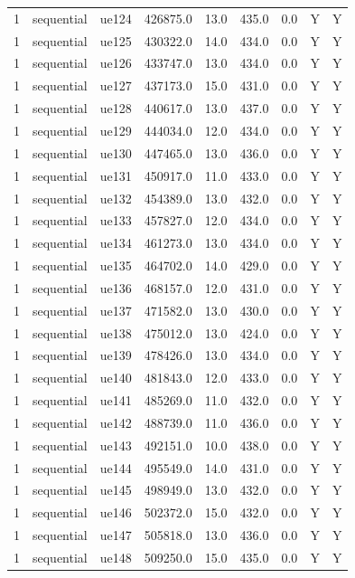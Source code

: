 \begin{table}[ht]
\begin{tabular}{|c|c|c|c|c|c|c|c|c|}
1 & sequential & ue124 & 426875.0 & 13.0 & 435.0 & 0.0 & Y & Y \\
1 & sequential & ue125 & 430322.0 & 14.0 & 434.0 & 0.0 & Y & Y \\
1 & sequential & ue126 & 433747.0 & 13.0 & 434.0 & 0.0 & Y & Y \\
1 & sequential & ue127 & 437173.0 & 15.0 & 431.0 & 0.0 & Y & Y \\
1 & sequential & ue128 & 440617.0 & 13.0 & 437.0 & 0.0 & Y & Y \\
1 & sequential & ue129 & 444034.0 & 12.0 & 434.0 & 0.0 & Y & Y \\
1 & sequential & ue130 & 447465.0 & 13.0 & 436.0 & 0.0 & Y & Y \\
1 & sequential & ue131 & 450917.0 & 11.0 & 433.0 & 0.0 & Y & Y \\
1 & sequential & ue132 & 454389.0 & 13.0 & 432.0 & 0.0 & Y & Y \\
1 & sequential & ue133 & 457827.0 & 12.0 & 434.0 & 0.0 & Y & Y \\
1 & sequential & ue134 & 461273.0 & 13.0 & 434.0 & 0.0 & Y & Y \\
1 & sequential & ue135 & 464702.0 & 14.0 & 429.0 & 0.0 & Y & Y \\
1 & sequential & ue136 & 468157.0 & 12.0 & 431.0 & 0.0 & Y & Y \\
1 & sequential & ue137 & 471582.0 & 13.0 & 430.0 & 0.0 & Y & Y \\
1 & sequential & ue138 & 475012.0 & 13.0 & 424.0 & 0.0 & Y & Y \\
1 & sequential & ue139 & 478426.0 & 13.0 & 434.0 & 0.0 & Y & Y \\
1 & sequential & ue140 & 481843.0 & 12.0 & 433.0 & 0.0 & Y & Y \\
1 & sequential & ue141 & 485269.0 & 11.0 & 432.0 & 0.0 & Y & Y \\
1 & sequential & ue142 & 488739.0 & 11.0 & 436.0 & 0.0 & Y & Y \\
1 & sequential & ue143 & 492151.0 & 10.0 & 438.0 & 0.0 & Y & Y \\
1 & sequential & ue144 & 495549.0 & 14.0 & 431.0 & 0.0 & Y & Y \\
1 & sequential & ue145 & 498949.0 & 13.0 & 432.0 & 0.0 & Y & Y \\
1 & sequential & ue146 & 502372.0 & 15.0 & 432.0 & 0.0 & Y & Y \\
1 & sequential & ue147 & 505818.0 & 13.0 & 436.0 & 0.0 & Y & Y \\
1 & sequential & ue148 & 509250.0 & 15.0 & 435.0 & 0.0 & Y & Y \\

\end{tabular}
\end{table}
